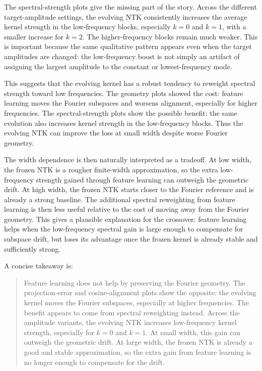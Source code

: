 \documentclass[11pt]{article}
\begin{document}
The spectral-strength plots give the missing part of the story. Across the
different target-amplitude settings, the evolving NTK consistently increases the
average kernel strength in the low-frequency blocks, especially \(k=0\) and
\(k=1\), with a smaller increase for \(k=2\). The higher-frequency blocks remain
much weaker. This is important because the same qualitative pattern appears even
when the target amplitudes are changed: the low-frequency boost is not simply an
artifact of assigning the largest amplitude to the constant or lowest-frequency
mode.

This suggests that the evolving kernel has a robust tendency to reweight spectral
strength toward low frequencies. The geometry plots showed the cost: feature
learning moves the Fourier subspaces and worsens alignment, especially for higher
frequencies. The spectral-strength plots show the possible benefit: the same
evolution also increases kernel strength in the low-frequency blocks. Thus the
evolving NTK can improve the loss at small width despite worse Fourier geometry.

The width dependence is then naturally interpreted as a tradeoff. At low width,
the frozen NTK is a rougher finite-width approximation, so the extra
low-frequency strength gained through feature learning can outweigh the geometric
drift. At high width, the frozen NTK starts closer to the Fourier reference and
is already a strong baseline. The additional spectral reweighting from feature
learning is then less useful relative to the cost of moving away from the
Fourier geometry. This gives a plausible explanation for the crossover: feature
learning helps when the low-frequency spectral gain is large enough to compensate
for subspace drift, but loses its advantage once the frozen kernel is already
stable and sufficiently strong.

A concise takeaway is:
\begin{quote}
	Feature learning does not help by preserving the Fourier geometry. The
	projection-error and cosine-alignment plots show the opposite: the evolving
	kernel moves the Fourier subspaces, especially at higher frequencies. The
	benefit appears to come from spectral reweighting instead. Across the
	amplitude variants, the evolving NTK increases low-frequency kernel strength,
	especially for \(k=0\) and \(k=1\). At small width, this gain can outweigh
	the geometric drift. At large width, the frozen NTK is already a good and
	stable approximation, so the extra gain from feature learning is no longer
	enough to compensate for the drift.
\end{quote}
\end{document}
